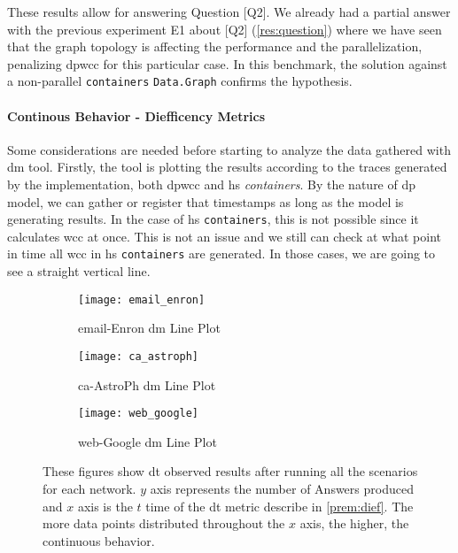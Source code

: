 These results allow for answering Question [Q2].
We already had a partial answer with the previous experiment E1 about [Q2] (\autoref{res:question}) where we have seen that the graph topology is affecting the performance and the parallelization, penalizing \acrshort{dpwcc} for this particular case. In this benchmark, the solution against a non-parallel \texttt{containers} \texttt{Data.Graph} confirms the hypothesis. 

\paragraph{Continous Behavior - Diefficency Metrics}\label{sub:sub:sec:e2}
Some considerations are needed before starting to analyze the data gathered with \acrshort{dm} tool. Firstly, the tool is plotting the results according to the traces generated by the implementation, both \acrshort{dpwcc} and \acrshort{hs} \emph{containers}. By the nature of \acrshort{dp} model, we can gather or register that timestamps as long as the model is generating results. In the case of \acrshort{hs} \texttt{containers}, this is not possible since it calculates \acrshort{wcc} at once. This is not an issue and we still can check at what point in time all \acrshort{wcc} in \acrshort{hs} \texttt{containers} are generated. In those cases, we are going to see a straight vertical line. 

\begin{figure}[!htp]
  \centering
  \begin{subfigure}[t]{0.3\textwidth}
   \texttt{[image: email\_enron]}
   \caption{email-Enron \acrlong{dm} Line Plot}
    \label{fig:dief:1}
  \end{subfigure}\hfill
  \begin{subfigure}[t]{0.3\textwidth}
   \texttt{[image: ca\_astroph]}
   \caption{ca-AstroPh \acrlong{dm} Line Plot}
    \label{fig:dief:2}
  \end{subfigure}\hfill
  \begin{subfigure}[t]{0.3\textwidth}
   \texttt{[image: web\_google]}
   \caption{web-Google \acrlong{dm} Line Plot}
    \label{fig:dief:3}
  \end{subfigure}\hfill
   \caption{These figures show \acrshort{dt} observed results after running all the scenarios for each network. $y$ axis represents the number of Answers produced and $x$ axis is the $t$ time of the \acrshort{dt} metric describe in \autoref{prem:dief}. The more data points distributed throughout the $x$ axis, the higher, the continuous behavior.}
   \label{fig:dief:all}
 \end{figure}


